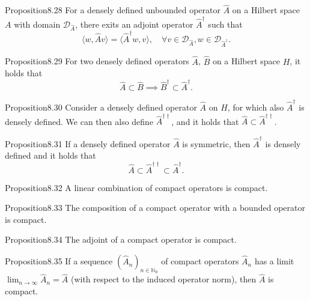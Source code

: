 \begin{res}{Proposition}{8.28}
For a densely defined unbounded operator $\hat A$ on a Hilbert space $A$ with domain $\mathcal D_{\hat A}$, there exits an adjoint operator $\hat A^\dagger$ such that
\begin{equation}\langle w,\hat Av\rangle=\langle\hat A^\dagger w,v\rangle,\quad\forall v\in\mathcal D_{\hat A},w\in\mathcal D_{\hat A^\dagger}.\tag{8.105}\end{equation}
\end{res}

\begin{res}{Proposition}{8.29}
For two densely defined operators $\hat A$, $\hat B$ on a Hilbert space $H$, it holds that
\begin{equation}\hat A\subset\hat B\implies\hat B^\dagger\subset\hat A^\dagger.\tag{8.106}\end{equation}
\end{res}

\begin{res}{Proposition}{8.30}
Consider a densely defined operator $\hat A$ on $H$, for which also $\hat A^\dagger$ is densely defined. We can then also define $\hat A^{\dagger\dagger}$, and it holds that $\hat A\subset\hat A^{\dagger\dagger}$.
\end{res}

\begin{res}{Proposition}{8.31}
If a densely defined operator $\hat A$ is symmetric, then $\hat A^\dagger$ is densely defined and it holds that
\begin{equation}\hat A\subset\hat A^{\dagger\dagger}\subset\hat A^\dagger.\tag{8.108}\end{equation}
\end{res}

\begin{res}{Proposition}{8.32}
A linear combination of compact operators is compact.
\end{res}

\begin{res}{Proposition}{8.33}
The composition of a compact operator with a bounded operator is compact.
\end{res}

\begin{res}{Proposition}{8.34}
The adjoint of a compact operator is compact.
\end{res}

\begin{res}{Proposition}{8.35}
If a sequence $(\hat A_n)_{n\in\mathbb N_0}$ of compact operators $\hat A_n$ has a limit $\lim_{n\to\infty}\hat A_n=\hat A$ (with respect to the induced operator norm), then $\hat A$ is compact.
\end{res}

